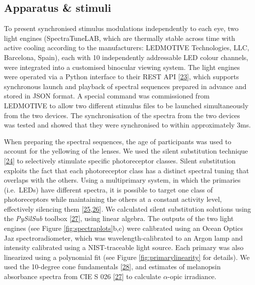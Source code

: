 \documentclass[
]{article}
\begin{document}
\hypertarget{apparatus-stimuli}{%
\subsection{Apparatus \& stimuli}\label{apparatus-stimuli}}

To present synchronised stimulus modulations independently to each eye, two light engines (SpectraTuneLAB, which are thermally stable across time with active cooling according to the manufacturers: LEDMOTIVE Technologies, LLC, Barcelona, Spain), each with 10 independently addressable LED colour channels, were integrated into a customised binocular viewing system. The light engines were operated via a Python interface to their REST API {[}\protect\hyperlink{ref-Martin2022}{23}{]}, which supports synchronous launch and playback of spectral sequences prepared in advance and stored in JSON format. A special command was commissioned from LEDMOTIVE to allow two different stimulus files to be launched simultaneously from the two devices. The synchronisation of the spectra from the two devices was tested and showed that they were synchronised to within approximately 3ms.

When preparing the spectral sequences, the age of participants was used to account for the yellowing of the lenses. We used the silent substitution technique {[}\protect\hyperlink{ref-Estevez1982}{24}{]} to selectively stimulate specific photoreceptor classes. Silent substitution exploits the fact that each photoreceptor class has a distinct spectral tuning that overlaps with the others. Using a multiprimary system, in which the primaries (i.e.~LEDs) have different spectra, it is possible to target one class of photoreceptors while maintaining the others at a constant activity level, effectively silencing them {[}\protect\hyperlink{ref-Shapiro1996}{25},\protect\hyperlink{ref-Spitschan2018}{26}{]}. We calculated silent substitution solutions using the \emph{PySilSub} toolbox {[}\protect\hyperlink{ref-Martin2023}{27}{]}, using linear algebra. The outputs of the two light engines (see Figure \ref{fig:spectraplots}b,c) were calibrated using an Ocean Optics Jaz spectroradiometer, which was wavelength-calibrated to an Argon lamp and intensity calibrated using a NIST-traceable light source. Each primary was also linearized using a polynomial fit (see Figure \ref{fig:primarylinearity} for details). We used the 10-degree cone fundamentals {[}\protect\hyperlink{ref-Stockman2000}{28}{]}, and estimates of melanopsin absorbance spectra from CIE S 026 {[}\protect\hyperlink{ref-Martin2023}{27}{]} to calculate \(\alpha\)-opic irradiance.
\end{document}

